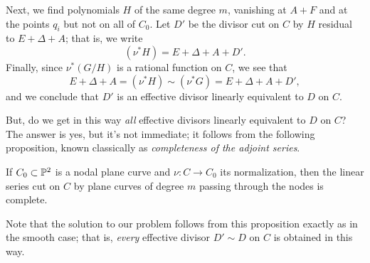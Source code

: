 Next, we find polynomials $H$ of the same degree $m$, vanishing at $A+F$ and at the points $q_i$ but not on all of $C_0$. Let $D'$ be the divisor cut on $C$ by $H$ residual to $E + \Delta + A$; that is, we write
$$
(\nu^*H) = E + \Delta + A + D'.
$$
Finally, since $\nu^*(G/H)$ is a rational function on $C$, we see that 
$$
E + \Delta + A = (\nu^*H) \sim (\nu^*G) = E + \Delta + A + D',
$$
and we conclude that $D'$ is an effective divisor linearly equivalent to $D$ on $C$.

But, do we get in this way \emph{all} effective divisors linearly equivalent to $D$ on $C$? The answer is yes, but it's not immediate; it follows from the following proposition, known classically as \emph{completeness of the adjoint series}.

\begin{proposition}\label{adjoint completeness}
If $C_0 \subset {\mathbb P}^2$ is a nodal plane curve and $\nu : C \to C_0$ its normalization, then the linear series cut on $C$ by plane curves of degree $m$ passing through the nodes is complete.
\end{proposition}

Note  that the solution to our problem follows from this proposition exactly as in the smooth case; that is, \emph{every} effective divisor $D' \sim D$ on $C$ is obtained in this way.

